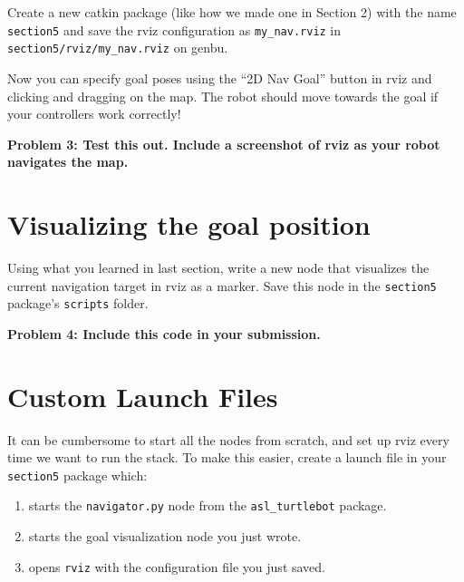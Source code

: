 \documentclass{article}
\begin{document}
Create a new catkin package (like how we made one in Section 2) with the name \texttt{section5} and save the rviz configuration as \texttt{my\_nav.rviz} in \texttt{section5/rviz/my\_nav.rviz} on genbu.



Now you can specify goal poses using the ``2D Nav Goal'' button in rviz and clicking and dragging on the map. The robot should move towards the goal if your controllers work correctly!

\textbf{Problem 3: Test this out. Include a screenshot of rviz as your robot navigates the map.}

\section{Visualizing the goal position}
Using what you learned in last section, write a new node that visualizes the current navigation target in rviz as a marker. Save this node in the \texttt{section5} package's \texttt{scripts} folder.

\textbf{Problem 4: Include this code in your submission.}

\section{Custom Launch Files}
It can be cumbersome to start all the nodes from scratch, and set up rviz every time we want to run the stack. To make this easier, create a launch file in your \texttt{section5} package which:
\begin{enumerate}
    \item starts the \texttt{navigator.py} node from the \texttt{asl\_turtlebot} package.
    \item starts the goal visualization node you just wrote.
    \item opens \texttt{rviz} with the configuration file you just saved.
\end{enumerate}
\end{document}
